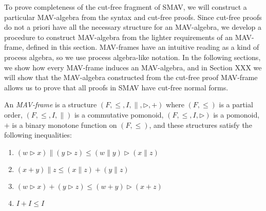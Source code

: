 To prove completeness of the cut-free fragment of SMAV, we will
construct a particular MAV-algebra from the syntax and cut-free
proofs. Since cut-free proofs do not a priori have all the necessary
structure for an MAV-algebra, we develop a procedure to construct
MAV-algebra from the lighter requirements of an MAV-frame, defined in
this section. MAV-frames have an intuitive reading as a kind of
process algebra, so we use process algebra-like notation. In the
following sections, we show how every MAV-frame induces an
MAV-algebra, and in Section XXX we will show that the MAV-algebra
constructed from the cut-free proof MAV-frame allows us to prove that
all proofs in SMAV have cut-free normal forms.

\begin{definition}
  An \emph{MAV-frame} is a structure
  $(F, \leq, I, \parallel, \rhd, +)$ where $(F, \leq)$ is a partial
  order, $(F, \leq, I, \parallel)$ is a commutative pomonoid,
  $(F, \leq, I, \rhd)$ is a pomonoid, $+$ is a binary monotone
  function on $(F, \leq)$, and these structures satisfy the following
  inequalities:
  \begin{enumerate}
  \item $(w \rhd x) \parallel (y \rhd z) \leq (w \parallel y) \rhd (x \parallel z)$
  \item $(x + y) \parallel z \leq (x \parallel z) + (y \parallel z)$
  \item $(w \rhd x) + (y \rhd z) \leq (w + y) \rhd (x + z)$
  \item $I + I \leq I$
  \end{enumerate}
\end{definition}

\begin{remark}
\end{remark}

\begin{remark}
\end{remark}

